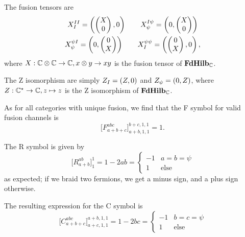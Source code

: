 The fusion tensors are
\begin{gather}
    \begin{gathered}
        X^{II}_I = \fermpair{\begin{pmatrix} X \\ 0\end{pmatrix}}{0}
        \qquad X^{I\psi}_\psi = \fermpair{0}{\begin{pmatrix} X \\ 0\end{pmatrix}}
        \\
        X^{\psi I}_\psi = \fermpair{0}{\begin{pmatrix} 0 \\ X\end{pmatrix}}
        \qquad X^{\psi\psi}_I = \fermpair{\begin{pmatrix} 0 \\ X\end{pmatrix}}{0}
        ,
    \end{gathered}
\end{gather}
where $X : \mathbb{C} \otimes \mathbb{C} \to \mathbb{C} , x \otimes y \to xy$ is the fusion tensor of $\mathbf{FdHilb}_{\mathbb{C}}$.

The Z isomorphism are simply $Z_I = \fermpair{Z}{0}$ and $Z_\psi = \fermpair{0}{Z}$, where $Z : \mathbb{C}^\star \to \mathbb{C} , z \mapsto z$ is the Z isomorphism of $\mathbf{FdHilb}_{\mathbb{C}}$.

As for all categories with unique fusion, we find that the F symbol for valid fusion channels is
\begin{equation}
    \big[ F^{abc}_{a + b + c} \big]^{b + c,1,1}_{a + b,1,1} = 1
    .
\end{equation}

The R symbol is given by
\begin{equation}
    \big[R^{ab}_{a + b}\big]^1_1
    = 1 - 2ab
    = \begin{cases} -1 & a = b = \psi \\ 1 & \text{else}\end{cases}
\end{equation}
as expected; if we braid two fermions, we get a minus sign, and a plus sign otherwise.

The resulting expression for the C symbol is 
\begin{equation}
    \big[ C^{abc}_{a + b + c} \big]^{a + b,1,1}_{a + c,1,1} = 1 - 2 bc
    = \begin{cases} -1 & b = c = \psi \\ 1 & \text{else}\end{cases}
\end{equation}

